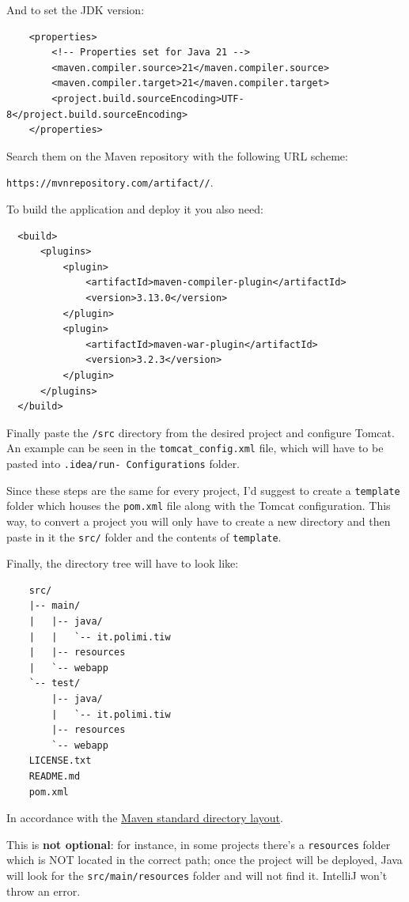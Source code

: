 And to set the JDK version:
\begin{verbatim}
    <properties>
        <!-- Properties set for Java 21 -->
        <maven.compiler.source>21</maven.compiler.source>
        <maven.compiler.target>21</maven.compiler.target>
        <project.build.sourceEncoding>UTF-8</project.build.sourceEncoding>
    </properties>
\end{verbatim}

Search them on the Maven repository with the following URL scheme:

\begin{center}
  \texttt{https://mvnrepository.com/artifact//}.
\end{center}

To build the application and deploy it you also need:
\begin{verbatim}
  <build>
      <plugins>
          <plugin>
              <artifactId>maven-compiler-plugin</artifactId>
              <version>3.13.0</version>
          </plugin>
          <plugin>
              <artifactId>maven-war-plugin</artifactId>
              <version>3.2.3</version>
          </plugin>
      </plugins>
  </build>
\end{verbatim}

Finally paste the \texttt{/src} directory from the desired project and configure Tomcat. An example can be seen in the \texttt{tomcat\_config.xml} file, which will have to be pasted into \texttt{.idea/run- Configurations} folder.

\begin{tip}{}
  Since these steps are the same for every project, I'd suggest to create a \texttt{template} folder which houses the \texttt{pom.xml} file along with the Tomcat configuration. This way, to convert a project you will only have to create a new directory and then paste in it the \texttt{src/} folder and the contents of \texttt{template}.
\end{tip}

\begin{warning}{}
  Finally, the directory tree will have to look like:
  \begin{verbatim}
    src/
    |-- main/
    |   |-- java/
    |   |   `-- it.polimi.tiw
    |   |-- resources
    |   `-- webapp
    `-- test/
        |-- java/
        |   `-- it.polimi.tiw
        |-- resources
        `-- webapp
    LICENSE.txt
    README.md
    pom.xml
  \end{verbatim}

  In accordance with the \href{https://maven.apache.org/guides/introduction/introduction-to-the-standard-directory-layout.html}{Maven standard directory layout}.

  This is \textbf{not optional}: for instance, in some projects there's a \texttt{resources} folder which is NOT located in the correct path; once the project will be deployed, Java will look for the \texttt{src/main/resources} folder and will not find it. IntelliJ won't throw an error.
\end{warning}
